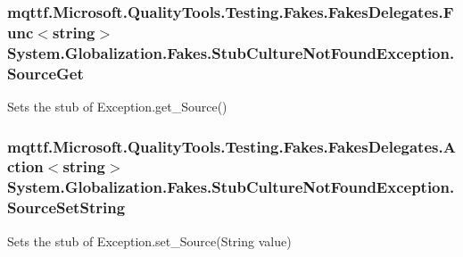 \hypertarget{class_system_1_1_globalization_1_1_fakes_1_1_stub_culture_not_found_exception_a021f2b9d3b203acf031234594c552f99}{
\subsubsection[{Source\-Get}]{\setlength{\rightskip}{0pt plus 5cm}mqttf.\-Microsoft.\-Quality\-Tools.\-Testing.\-Fakes.\-Fakes\-Delegates.\-Func$<$string$>$ System.\-Globalization.\-Fakes.\-Stub\-Culture\-Not\-Found\-Exception.\-Source\-Get}}\label{class_system_1_1_globalization_1_1_fakes_1_1_stub_culture_not_found_exception_a021f2b9d3b203acf031234594c552f99}


Sets the stub of Exception.\-get\-\_\-\-Source()

\hypertarget{class_system_1_1_globalization_1_1_fakes_1_1_stub_culture_not_found_exception_a86dc4df2c3a399b6fca803da7aa59799}{
\subsubsection[{Source\-Set\-String}]{\setlength{\rightskip}{0pt plus 5cm}mqttf.\-Microsoft.\-Quality\-Tools.\-Testing.\-Fakes.\-Fakes\-Delegates.\-Action$<$string$>$ System.\-Globalization.\-Fakes.\-Stub\-Culture\-Not\-Found\-Exception.\-Source\-Set\-String}}\label{class_system_1_1_globalization_1_1_fakes_1_1_stub_culture_not_found_exception_a86dc4df2c3a399b6fca803da7aa59799}


Sets the stub of Exception.\-set\-\_\-\-Source(\-String value)

